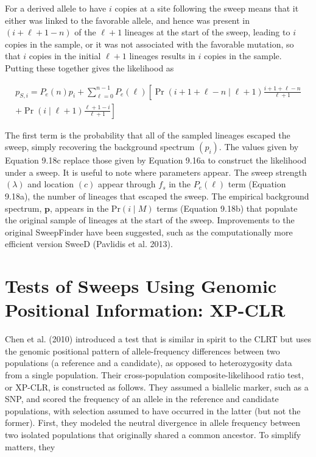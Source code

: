 \documentclass{article}
\begin{document}
For a derived allele to have $i$ copies at a site following the sweep means that it either was linked to the favorable allele, and hence was present in $(i+\ell+1-n)$ of the $\ell+1$ lineages at the start of the sweep, leading to $i$ copies in the sample, or it was not associated with the favorable mutation, so that $i$ copies in the initial $\ell+1$ lineages results in $i$ copies in the sample. Putting these together gives the likelihood as

\begin{equation}
\begin{aligned}p_{S,i}=P_{e}(n)p_{i}+\sum_{\ell=0}^{n-1}P_{e}(\ell)\left[\Pr\left(i+1+\ell-n\mid\ell+1\right)\frac{i+1+\ell-n}{\ell+1}\right.\\ \left.+\Pr\left(i\mid\ell+1\right)\frac{\ell+1-i}{\ell+1}\right]\end{aligned}
\tag{9.18c}
\label{eq:9_18c}
\end{equation}

The first term is the probability that all of the sampled lineages escaped the sweep, simply recovering the background spectrum  $ (p_i) $. The values given by Equation 9.18c replace those given by Equation 9.16a to construct the likelihood under a sweep. It is useful to note where parameters appear. The sweep strength  $ (\lambda) $ and location  $ (c) $ appear through  $ f_s $ in the  $ P_e(\ell) $ term (Equation 9.18a), the number of lineages that escaped the sweep. The empirical background spectrum,  $ \mathbf{p} $, appears in the  $ \mathrm{Pr}(i \mid M) $ terms (Equation 9.18b) that populate the original sample of lineages at the start of the sweep. Improvements to the original SweepFinder have been suggested, such as the computationally more efficient version SweeD (Pavlidis et al. 2013).

\section{Tests of Sweeps Using Genomic Positional Information: XP-CLR}
Chen et al. (2010) introduced a test that is similar in spirit to the CLRT but uses the genomic positional pattern of allele-frequency differences between two populations (a reference and a candidate), as opposed to heterozygosity data from a single population. Their cross-population composite-likelihood ratio test, or XP-CLR, is constructed as follows. They assumed a biallelic marker, such as a SNP, and scored the frequency of an allele in the reference and candidate populations, with selection assumed to have occurred in the latter (but not the former). First, they modeled the neutral divergence in allele frequency between two isolated populations that originally shared a common ancestor. To simplify matters, they
\end{document}

